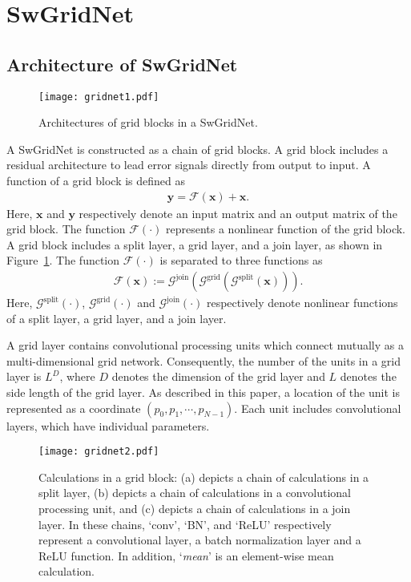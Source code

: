 \documentclass[10pt,twocolumn,letterpaper]{article}
\begin{document}
\section{SwGridNet}
\label{sec:proposal}

\subsection{Architecture of SwGridNet}
\label{subsec:arch}

\begin{figure}
\centering
 \texttt{[image: gridnet1.pdf]}
 \caption{Architectures of grid blocks in a SwGridNet.}
 \label{fig:gridnet1}
\end{figure}

A SwGridNet is constructed as a chain of grid blocks.
A grid block includes a residual architecture to lead error signals directly from output to input.
A function of a grid block is defined as
\begin{eqnarray}{\bm y} = \mathcal{F}({\bm x}) + {\bm x}.
\end{eqnarray}
Here, ${\bm x}$ and ${\bm y} $ respectively denote an input matrix and an output matrix of the grid block.
The function $\mathcal{F}(\cdot)$ represents a nonlinear function of the grid block.
A grid block includes a split layer, a grid layer, and a join layer, as shown in Figure~\ref{fig:gridnet1}.
The function $\mathcal{F}(\cdot)$ is separated to three functions as
\begin{eqnarray}
\mathcal{F}({\bm x}) := \mathcal{G}^{\textrm{join}}(\mathcal{G}^{\textrm{grid}}(\mathcal{G}^{\textrm{split}}({\bm x}))).
\end{eqnarray}
Here, $\mathcal{G}^{\textrm{split}}(\cdot)$, $\mathcal{G}^{\textrm{grid}}(\cdot)$ and $\mathcal{G}^{\textrm{join}}(\cdot)$ respectively denote nonlinear functions
of a split layer, a grid layer, and a join layer.

A grid layer contains convolutional processing units which connect mutually as a multi-dimensional grid network.
Consequently, the number of the units in a grid layer is $L^D$,
where $D$ denotes the dimension of the grid layer and $L$ denotes the side length of the grid layer.
As described in this paper, a location of the unit is represented as a coordinate $(p_0,p_1,\cdots,p_{N-1})$.
Each unit includes convolutional layers, which have individual parameters.

\begin{figure}
\centering
 \texttt{[image: gridnet2.pdf]}
 \caption{Calculations in a grid block:
(a) depicts a chain of calculations in a split layer,
(b) depicts a chain of calculations in a convolutional processing unit,
and (c) depicts a chain of calculations in a join layer.
In these chains, `conv', `BN', and `ReLU' respectively represent a convolutional layer, a batch normalization layer and a ReLU function.
In addition, `{\it mean}' is an element-wise mean calculation.}
 \label{fig:gridnet2}
\end{figure}
\end{document}
